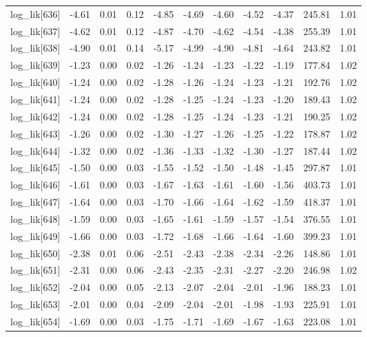 \begin{table}[ht]
\begin{tabular}{rrrrrrrrrrr}
  log\_lik[636] & -4.61 & 0.01 & 0.12 & -4.85 & -4.69 & -4.60 & -4.52 & -4.37 & 245.81 & 1.01 \\ 
  log\_lik[637] & -4.62 & 0.01 & 0.12 & -4.87 & -4.70 & -4.62 & -4.54 & -4.38 & 255.39 & 1.01 \\ 
  log\_lik[638] & -4.90 & 0.01 & 0.14 & -5.17 & -4.99 & -4.90 & -4.81 & -4.64 & 243.82 & 1.01 \\ 
  log\_lik[639] & -1.23 & 0.00 & 0.02 & -1.26 & -1.24 & -1.23 & -1.22 & -1.19 & 177.84 & 1.02 \\ 
  log\_lik[640] & -1.24 & 0.00 & 0.02 & -1.28 & -1.26 & -1.24 & -1.23 & -1.21 & 192.76 & 1.02 \\ 
  log\_lik[641] & -1.24 & 0.00 & 0.02 & -1.28 & -1.25 & -1.24 & -1.23 & -1.20 & 189.43 & 1.02 \\ 
  log\_lik[642] & -1.24 & 0.00 & 0.02 & -1.28 & -1.25 & -1.24 & -1.23 & -1.21 & 190.25 & 1.02 \\ 
  log\_lik[643] & -1.26 & 0.00 & 0.02 & -1.30 & -1.27 & -1.26 & -1.25 & -1.22 & 178.87 & 1.02 \\ 
  log\_lik[644] & -1.32 & 0.00 & 0.02 & -1.36 & -1.33 & -1.32 & -1.30 & -1.27 & 187.44 & 1.02 \\ 
  log\_lik[645] & -1.50 & 0.00 & 0.03 & -1.55 & -1.52 & -1.50 & -1.48 & -1.45 & 297.87 & 1.01 \\ 
  log\_lik[646] & -1.61 & 0.00 & 0.03 & -1.67 & -1.63 & -1.61 & -1.60 & -1.56 & 403.73 & 1.01 \\ 
  log\_lik[647] & -1.64 & 0.00 & 0.03 & -1.70 & -1.66 & -1.64 & -1.62 & -1.59 & 418.37 & 1.01 \\ 
  log\_lik[648] & -1.59 & 0.00 & 0.03 & -1.65 & -1.61 & -1.59 & -1.57 & -1.54 & 376.55 & 1.01 \\ 
  log\_lik[649] & -1.66 & 0.00 & 0.03 & -1.72 & -1.68 & -1.66 & -1.64 & -1.60 & 399.23 & 1.01 \\ 
  log\_lik[650] & -2.38 & 0.01 & 0.06 & -2.51 & -2.43 & -2.38 & -2.34 & -2.26 & 148.86 & 1.01 \\ 
  log\_lik[651] & -2.31 & 0.00 & 0.06 & -2.43 & -2.35 & -2.31 & -2.27 & -2.20 & 246.98 & 1.02 \\ 
  log\_lik[652] & -2.04 & 0.00 & 0.05 & -2.13 & -2.07 & -2.04 & -2.01 & -1.96 & 188.23 & 1.01 \\ 
  log\_lik[653] & -2.01 & 0.00 & 0.04 & -2.09 & -2.04 & -2.01 & -1.98 & -1.93 & 225.91 & 1.01 \\ 
  log\_lik[654] & -1.69 & 0.00 & 0.03 & -1.75 & -1.71 & -1.69 & -1.67 & -1.63 & 223.08 & 1.01 \\ 

\end{tabular}
\end{table}
